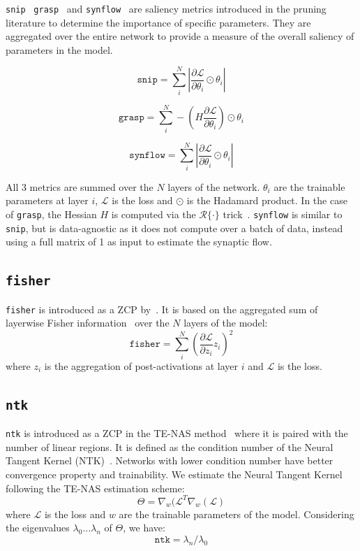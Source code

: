 \documentclass[10pt]{article} %
\begin{document}
\texttt{snip}~\citep{lee2018snip} \texttt{grasp}~\citep{wang2020picking} and \texttt{synflow}~\citep{tanaka2020pruning} are saliency metrics introduced in the pruning literature to determine the importance of specific parameters. They are aggregated over the entire network to provide a measure of the overall saliency of parameters in the model.

$$
\texttt{snip} = \sum_i^N |\frac{\partial \mathcal{L}}{\partial \theta_i} \odot \theta_i|
$$

$$
\texttt{grasp} = \sum_i^N -\left(H\frac{\partial \mathcal{L}}{\partial \theta_i}\right) \odot \theta_i
$$

$$
\texttt{synflow} = \sum_i^N |\frac{\partial \mathcal{L}}{\partial \theta_i} \odot \theta_i|
$$

All 3 metrics are summed over the $N$ layers of the network. $\theta_i$ are the trainable parameters at layer $i$, $\mathcal{L}$ is the loss and $\odot$ is the Hadamard product. In the case of \texttt{grasp}, the Hessian $H$ is computed via the $\mathcal{R}\{\cdot\}$ trick~\citep{pearlmutter1994fast}. \texttt{synflow} is similar to \texttt{snip}, but is data-agnostic as it does not compute over a batch of data, instead using a full matrix of 1 as input to estimate the synaptic flow.

\subsection{\texttt{fisher}}

\texttt{fisher} is introduced as a ZCP by~\citet{abdelfattah2021zero}. It is based on the aggregated sum of layerwise Fisher information~\citep{theis2018faster, turner2019blockswap} over the $N$ layers of the model:
$$
\texttt{fisher} = \sum_i^N \left( \frac{\partial \mathcal{L}}{\partial z_i} z_i \right)^2
$$
where $z_i$ is the aggregation of post-activations at layer $i$ and $\mathcal{L}$ is the loss.

\subsection{\texttt{ntk}}

\texttt{ntk} is introduced as a ZCP in the TE-NAS method~\citep{chen2021neural} where it is paired with the number of linear regions. It is defined as the condition number of the Neural Tangent Kernel (NTK)~\citep{jacot2018neural, lee2019wide, xiao2019disentangling}. Networks with lower condition number have better convergence property and trainability. We estimate the Neural Tangent Kernel following the TE-NAS estimation scheme:
$$
\Theta = \nabla_w(\mathcal{L}^T\nabla_w(\mathcal{L})
$$
where $\mathcal{L}$ is the loss and $w$ are the trainable parameters of the model. Considering the eigenvalues $\lambda_0 \dots \lambda_n$ of $\Theta$, we have:
$$
\texttt{ntk} =  \lambda_n / \lambda_0
$$
\end{document}
